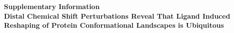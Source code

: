 \documentclass[11pt]{article}
\begin{document}
\vspace*{0.22\textheight}
\begin{center}
{\LARGE\bfseries Supplementary Information}\\[1.6em]
{\Large\bfseries Distal Chemical Shift Perturbations Reveal That Ligand Induced
Reshaping of Protein Conformational Landscapes is Ubiquitous}
\end{center}
\end{document}
